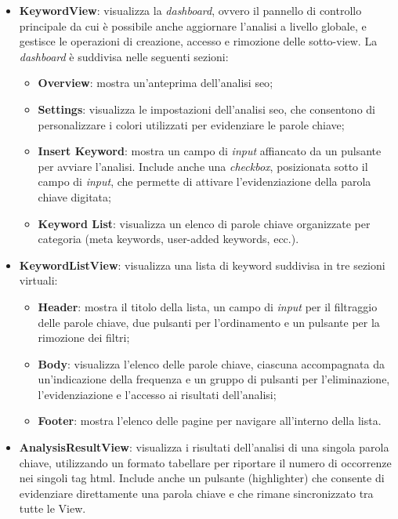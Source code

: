 \begin{itemize}
  \item \textbf{KeywordView}: visualizza la \textit{dashboard}, ovvero il pannello di controllo principale da cui è possibile anche aggiornare l’analisi a livello globale, e gestisce le operazioni di creazione, accesso e rimozione delle sotto-view. La \textit{dashboard} è suddivisa nelle seguenti sezioni:
  \begin{itemize}
    \item \textbf{Overview}: mostra un’anteprima dell’analisi \gls{seo};
    \item \textbf{Settings}: visualizza le impostazioni dell’analisi \gls{seo}, che consentono di personalizzare i colori utilizzati per evidenziare le parole chiave;
    \item \textbf{Insert Keyword}: mostra un campo di \textit{input} affiancato da un pulsante per avviare l’analisi. Include anche una \textit{checkbox}, posizionata sotto il campo di \textit{input}, che permette di attivare l’evidenziazione della parola chiave digitata;
    \item \textbf{Keyword List}: visualizza un elenco di parole chiave organizzate per categoria (meta keywords, user-added keywords, ecc.).
  \end{itemize}
  \item \textbf{KeywordListView}: visualizza una lista di keyword suddivisa in tre sezioni virtuali:
  \begin{itemize}
    \item \textbf{Header}: mostra il titolo della lista, un campo di \textit{input} per il filtraggio delle parole chiave, due pulsanti per l’ordinamento e un pulsante per la rimozione dei filtri;
    \item \textbf{Body}: visualizza l’elenco delle parole chiave, ciascuna accompagnata da un’indicazione della frequenza e un gruppo di pulsanti per l’eliminazione, l’evidenziazione e l’accesso ai risultati dell’analisi;
    \item \textbf{Footer}: mostra l’elenco delle pagine per navigare all’interno della lista.
  \end{itemize}
  \item \textbf{AnalysisResultView}: visualizza i risultati dell’analisi di una singola parola chiave, utilizzando un formato tabellare per riportare il numero di occorrenze nei singoli tag \gls{html}. Include anche un pulsante (highlighter) che consente di evidenziare direttamente una parola chiave e che rimane sincronizzato tra tutte le View.
\end{itemize}

